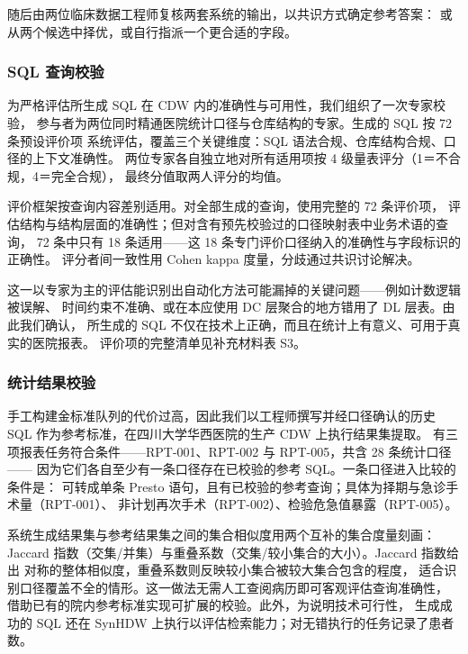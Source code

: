\documentclass[11pt,a4paper]{article}
\begin{document}
随后由两位临床数据工程师复核两套系统的输出，以共识方式确定参考答案：
或从两个候选中择优，或自行指派一个更合适的字段。

\subsubsection{SQL 查询校验}
为严格评估所生成 SQL 在 CDW 内的准确性与可用性，我们组织了一次专家校验，
参与者为两位同时精通医院统计口径与仓库结构的专家。生成的 SQL 按 72 条预设评价项
系统评估，覆盖三个关键维度：SQL 语法合规、仓库结构合规、口径的上下文准确性。
两位专家各自独立地对所有适用项按 4 级量表评分（1＝不合规，4＝完全合规），
最终分值取两人评分的均值。

评价框架按查询内容差别适用。对全部生成的查询，使用完整的 72 条评价项，
评估结构与结构层面的准确性；但对含有预先校验过的口径映射表中业务术语的查询，
72 条中只有 18 条适用——这 18 条专门评价口径纳入的准确性与字段标识的正确性。
评分者间一致性用 Cohen kappa 度量，分歧通过共识讨论解决。

这一以专家为主的评估能识别出自动化方法可能漏掉的关键问题——例如计数逻辑被误解、
时间约束不准确、或在本应使用 DC 层聚合的地方错用了 DL 层表。由此我们确认，
所生成的 SQL 不仅在技术上正确，而且在统计上有意义、可用于真实的医院报表。
评价项的完整清单见补充材料表 S3。

\subsubsection{统计结果校验}
手工构建金标准队列的代价过高，因此我们以工程师撰写并经口径确认的历史 SQL
作为参考标准，在四川大学华西医院的生产 CDW 上执行结果集提取。
有三项报表任务符合条件——RPT-001、RPT-002 与 RPT-005，共含 28 条统计口径——
因为它们各自至少有一条口径存在已校验的参考 SQL。一条口径进入比较的条件是：
可转成单条 Presto 语句，且有已校验的参考查询；具体为择期与急诊手术量（RPT-001）、
非计划再次手术（RPT-002）、检验危急值暴露（RPT-005）。

系统生成结果集与参考结果集之间的集合相似度用两个互补的集合度量刻画：
Jaccard 指数（交集/并集）与重叠系数（交集/较小集合的大小）。Jaccard 指数给出
对称的整体相似度，重叠系数则反映较小集合被较大集合包含的程度，
适合识别口径覆盖不全的情形。这一做法无需人工查阅病历即可客观评估查询准确性，
借助已有的院内参考标准实现可扩展的校验。此外，为说明技术可行性，
生成成功的 SQL 还在 SynHDW 上执行以评估检索能力；对无错执行的任务记录了患者数。
\end{document}
